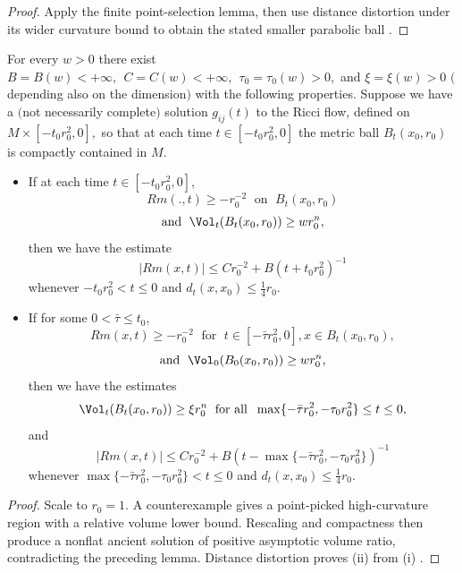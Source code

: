 \begin{proof}
\sketch Apply the finite point-selection lemma, then use distance
distortion under its wider curvature bound to obtain the stated smaller
parabolic ball \cite{P1}.
\end{proof}
\begin{theorem}
  \label{thm:cz-local-volume-growth-curvature-estimate}

For every $w>0$ there exist $B=B(w)<+\infty,\ \ C=C(w)<+\infty, \
\ \tau_0=\tau_0(w)>0,$ and $\xi=\xi(w)>0$ $($depending also on the
dimension$)$ with the following properties. Suppose we have a
$($not necessarily complete$)$ solution $g_{ij}(t)$ to the Ricci
flow, defined on $M\times[-t_0r_0^2,0],$ so that at each time
$t\in [-t_0r_0^2,0]$ the metric ball $B_t(x_0,r_0)$ is compactly
contained in $M.$
\begin{itemize}
\item[(i)] If at each time $t \in [-t_0r_0^2,0]$,
$$
Rm(.,t)\geq -r_0^{-2} \; \mbox{ on }\; B_t(x_0,r_0)
$$
$$
\mbox{and } \; \Vol_t(B_t(x_0,r_0))\geq wr_0^n,
$$
then we have the estimate
$$
|Rm(x,t)|\leq Cr_0^{-2}+B(t+t_0r_0^2)^{-1}
$$
whenever $-t_0r_0^2 < t\leq 0$ and $d_t(x,x_0)\leq
\frac{1}{4}r_0.$ \item[(ii)] If for some $0 < \bar{\tau} \leq
t_0$,
$$
Rm(x,t)\geq -r_0^{-2} \; \mbox{ for }\; t\in [-\bar{\tau}
r_0^2,0], x\in B_t(x_0,r_0),
$$
$$
\mbox{and } \; \Vol_0(B_0(x_0,r_0))\geq wr_0^n,
$$
then we have the estimates
$$
\Vol_t(B_t(x_0,r_0))\geq \xi r_0^n\; \mbox{ for all }\;
\max\{-\bar{\tau}r_0^2,-\tau_0r_0^2\}   \leq t \leq 0,
$$
and
$$
|Rm(x,t)|\leq Cr_0^{-2}+B(t -\max\{-\bar{\tau}r_0^2,-\tau_0r_0^2\}
)^{-1}
$$
whenever $\max\{-\bar{\tau}r_0^2,-\tau_0r_0^2\} < t\leq 0$ and
$d_t(x,x_0)\leq \frac{1}{4}r_0.$
\end{itemize}
\end{theorem}
\begin{proof}
\sketch Scale to $r_0=1$.  A counterexample gives a point-picked
high-curvature region with a relative volume lower bound.  Rescaling and
compactness then produce a nonflat ancient solution of positive
asymptotic volume ratio, contradicting the preceding lemma.  Distance
distortion proves (ii) from (i) \cite{P1}.
\end{proof}
